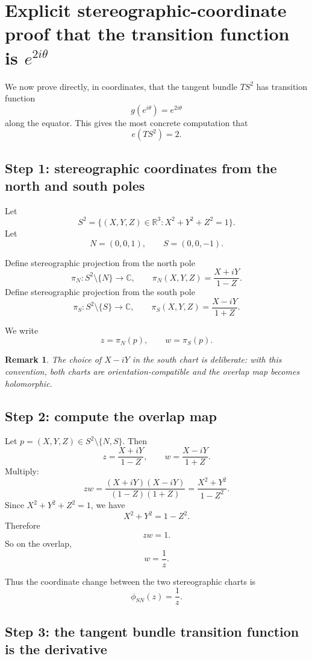 \documentclass[11pt]{article}
\newtheorem{remark}{Remark}
\begin{document}
	\newpage
	\section{Explicit stereographic-coordinate proof that the transition function is \(e^{2i\theta}\)}
	
	We now prove directly, in coordinates, that the tangent bundle \(TS^2\) has transition function
	\[
	g(e^{i\theta})=e^{2i\theta}
	\]
	along the equator. This gives the most concrete computation that
	\[
	e(TS^2)=2.
	\]
	
	\subsection*{Step 1: stereographic coordinates from the north and south poles}
	
	Let
	\[
	S^2=\{(X,Y,Z)\in \mathbb{R}^3 : X^2+Y^2+Z^2=1\}.
	\]
	Let
	\[
	N=(0,0,1),\qquad S=(0,0,-1).
	\]
	
	Define stereographic projection from the north pole
	\[
	\pi_N:S^2\setminus\{N\}\to \mathbb{C},
	\qquad
	\pi_N(X,Y,Z)=\frac{X+iY}{1-Z}.
	\]
	Define stereographic projection from the south pole
	\[
	\pi_S:S^2\setminus\{S\}\to \mathbb{C},
	\qquad
	\pi_S(X,Y,Z)=\frac{X-iY}{1+Z}.
	\]
	
	We write
	\[
	z=\pi_N(p),\qquad w=\pi_S(p).
	\]
	
	\begin{remark}
		The choice of \(X-iY\) in the south chart is deliberate: with this convention, both charts are orientation-compatible and the overlap map becomes holomorphic.
	\end{remark}
	
	\subsection*{Step 2: compute the overlap map}
	
	Let \(p=(X,Y,Z)\in S^2\setminus\{N,S\}\). Then
	\[
	z=\frac{X+iY}{1-Z},
	\qquad
	w=\frac{X-iY}{1+Z}.
	\]
	Multiply:
	\[
	zw
	=
	\frac{(X+iY)(X-iY)}{(1-Z)(1+Z)}
	=
	\frac{X^2+Y^2}{1-Z^2}.
	\]
	Since \(X^2+Y^2+Z^2=1\), we have
	\[
	X^2+Y^2=1-Z^2.
	\]
	Therefore
	\[
	zw=1.
	\]
	So on the overlap,
	\[
	w=\frac{1}{z}.
	\]
	
	Thus the coordinate change between the two stereographic charts is
	\[
	\phi_{SN}(z)=\frac{1}{z}.
	\]
	
	\subsection*{Step 3: the tangent bundle transition function is the derivative}
	
\end{document}
